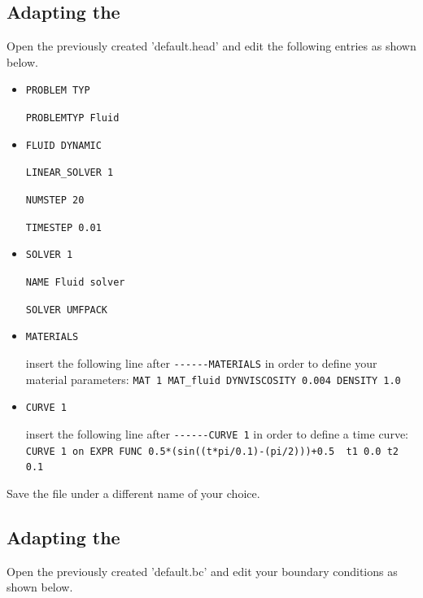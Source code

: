 \subsection{Adapting the \head}
Open the previously created \head 'default.head' and edit the following entries as shown below.
\begin{itemize}
 \item \verb|PROBLEM TYP|

 \verb|PROBLEMTYP Fluid|

 \item \verb|FLUID DYNAMIC|

 \verb|LINEAR_SOLVER 1|

 \verb|NUMSTEP 20|

 \verb|TIMESTEP 0.01|

 \item \verb|SOLVER 1|

 \verb|NAME Fluid solver|

 \verb|SOLVER UMFPACK|

 \item \verb|MATERIALS|

 insert the following line after \verb|------MATERIALS| in order to define your material parameters: \newline
 \verb|MAT 1 MAT_fluid DYNVISCOSITY 0.004 DENSITY 1.0|

 \item \verb|CURVE 1|

 insert the following line after \verb|------CURVE 1| in order to define a time curve: \\
 \verb|CURVE 1 on EXPR FUNC 0.5*(sin((t*pi/0.1)-(pi/2)))+0.5  t1 0.0 t2 0.1|

\end{itemize}
Save the file under a different name of your choice.

\subsection{Adapting the \bc}
Open the previously created \bc 'default.bc' and edit your boundary conditions as shown below.



